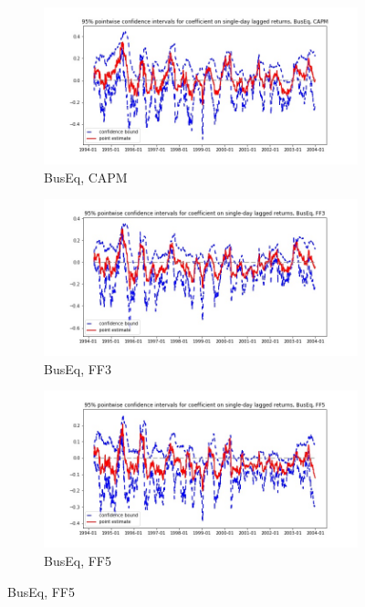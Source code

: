 \documentclass{article}
\begin{document}
\begin{landscape}
 \newpage
  
  \begin{figure}
  \centering
  \begin{subfigure}[b]{0.4\paperwidth}
    \centering
    \includegraphics[width=\textwidth]{BusEq/bwunif_pointwiseCIs_CAPM.jpg}
    \caption{BusEq, CAPM}
    \label{fig:1}
  \end{subfigure}
  \begin{subfigure}[b]{0.4\paperwidth}
    \centering
    \includegraphics[width=\textwidth]{BusEq/bwunif_pointwiseCIs_FF3.jpg}
    \caption{BusEq, FF3}
    \label{fig:2}
  \end{subfigure}
    \begin{subfigure}[b]{0.4\paperwidth}
    \centering
    \includegraphics[width=\textwidth]{BusEq/bwunif_pointwiseCIs_FF5.jpg}
    \caption{BusEq, FF5}
    \label{fig:1}
  \end{subfigure}
  \end{figure}
  

\end{landscape}
\end{document}
